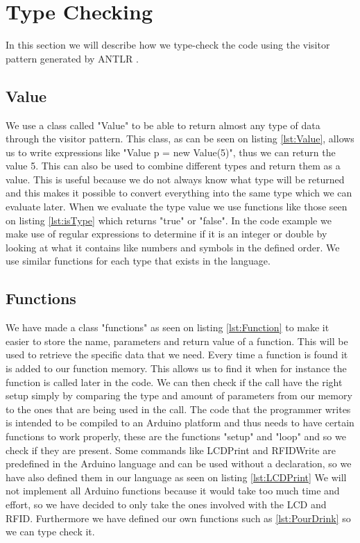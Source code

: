 \section{Type Checking}
\label{sec:typecheck}
In this section we will describe how we type-check the code using the visitor pattern generated by ANTLR \citep{ANTLR}.

\subsection*{Value}
We use a class called "Value" to be able to return almost any type of data through the visitor pattern.
This class, as can be seen on listing \ref{lst:Value}, allows us to write expressions like "Value p = new Value(5)", thus we can return the value 5. This can also be used to combine different types and return them as a value. This is useful because we do not always know what type will be returned and this makes it possible to convert everything into the same type which we can evaluate later.
When we evaluate the type value we use functions like those seen on listing \ref{lst:isType} which returns "true" or "false". In the code example we make use of regular expressions to determine if it is an integer or double by looking at what it contains like numbers and symbols in the defined order. We use similar functions for each type that exists in the language.

\subsection*{Functions}
We have made a class "functions" as seen on listing \ref{lst:Function} to make it easier to store the name, parameters and return value of a function. This will be used to retrieve the specific data that we need. Every time a function is found it is added to our function memory. This allows us to find it when for instance the function is called later in the code. We can then check if the call have the right setup simply by comparing the type and amount of parameters from our memory to the ones that are being used in the call.
The code that the programmer writes is intended to be compiled to an Arduino platform and thus needs to have certain functions to work properly, these are the functions "setup" and "loop" and so we check if they are present. Some commands like LCDPrint and RFIDWrite are predefined in the Arduino language and can be used without a declaration, so we have also defined them in our language as seen on listing \ref{lst:LCDPrint}
We will not implement all Arduino functions because it would take too much time and effort, so we have decided to only take the ones involved with the LCD and RFID. Furthermore we have defined our own functions such as \ref{lst:PourDrink} so we can type check it.

